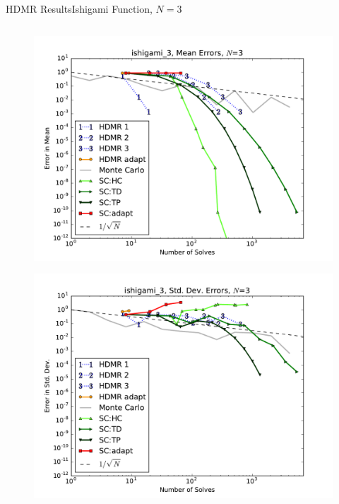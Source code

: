 \documentclass{beamer}
\begin{document}
\begin{frame}{HDMR Results}{Ishigami Function, $N=3$}
\begin{columns}
\begin{column}{0.5\textwidth}
\begin{figure}[h!]
          \includegraphics[width=0.8\linewidth]{anlmodels/ishigami_3_mean_errs}
        \end{figure}
        \vspace{-20pt}
        \begin{figure}[h!]
          \centering
          \includegraphics[width=0.8\linewidth]{anlmodels/ishigami_3_variance_errs}
        \end{figure}
   \end{column}
 \end{columns}
\end{frame}
\end{document}

